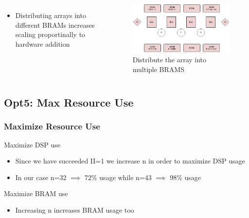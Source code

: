 \documentclass{beamer}
\begin{document}
\begin{frame}
\begin{columns}[c]
\end{columns}

\begin{columns}[c]


\begin{itemize}
\item Distributing arrays into different BRAMs increases scaling proportinally to hardware addition
\end{itemize}

\begin{figure}
\includegraphics[width=.6\linewidth,center]{arraysplit.jpg}
\caption{Distribute the array into multiple BRAMS}
\end{figure}

\end{columns}
\end{frame}
\begin{frame}
\subsection{Opt5: Max Resource Use}
\frametitle{Maximize Resource Use}

\begin{block}{Maximize DSP use}
\end{block}
\begin{itemize}
\item Since we have succeeded II=1 we increase n in order to maximize DSP usage
\item In our case n=32 $\implies$ $72\%$ usage while n=43 $\implies$ $98\%$ usage
\end{itemize}

\begin{block}{Maximize BRAM use}
\begin{itemize}
\item Increasing n increases BRAM usage too
\end{itemize}
\end{block}


\end{frame}
\end{document}
